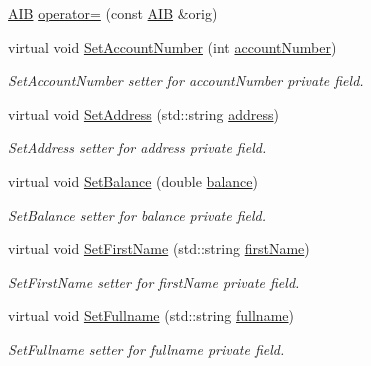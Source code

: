 \begin{DoxyCompactItemize}
\hyperlink{class_a_i_b}{A\+IB} \hyperlink{class_a_i_b_a77b6f74ea3ef39cb1ccb916db7a48740_a77b6f74ea3ef39cb1ccb916db7a48740}{operator=} (const \hyperlink{class_a_i_b}{A\+IB} \&orig)
\item 
virtual void \hyperlink{class_a_i_b_ae582677d2d890f1728dedb9f43965df6_ae582677d2d890f1728dedb9f43965df6}{Set\+Account\+Number} (int \hyperlink{class_a_i_b_aafc08efeec5b8c800c32ee32f20603a7_aafc08efeec5b8c800c32ee32f20603a7}{account\+Number})
\begin{DoxyCompactList}\small\item\em Set\+Account\+Number setter for account\+Number private field. \end{DoxyCompactList}\item 
virtual void \hyperlink{class_a_i_b_ab5fd22fbbc0ea75a022aaeb7174fc450_ab5fd22fbbc0ea75a022aaeb7174fc450}{Set\+Address} (std\+::string \hyperlink{class_a_i_b_ae6a67cc33d1e5fa83a52a238e45ca3dc_ae6a67cc33d1e5fa83a52a238e45ca3dc}{address})
\begin{DoxyCompactList}\small\item\em Set\+Address setter for address private field. \end{DoxyCompactList}\item 
virtual void \hyperlink{class_a_i_b_ac286e13b8cf985bc88ce356b0eaada81_ac286e13b8cf985bc88ce356b0eaada81}{Set\+Balance} (double \hyperlink{class_a_i_b_a3c8d637bd997c1f062d844a88e2559ba_a3c8d637bd997c1f062d844a88e2559ba}{balance})
\begin{DoxyCompactList}\small\item\em Set\+Balance setter for balance private field. \end{DoxyCompactList}\item 
virtual void \hyperlink{class_a_i_b_a671e44bdbf1286d97d7a22295177dd2e_a671e44bdbf1286d97d7a22295177dd2e}{Set\+First\+Name} (std\+::string \hyperlink{class_a_i_b_a869f72057cb63ebf0cfd257069e15c7c_a869f72057cb63ebf0cfd257069e15c7c}{first\+Name})
\begin{DoxyCompactList}\small\item\em Set\+First\+Name setter for first\+Name private field. \end{DoxyCompactList}\item 
virtual void \hyperlink{class_a_i_b_a03def15426e627042951369ea18b97f6_a03def15426e627042951369ea18b97f6}{Set\+Fullname} (std\+::string \hyperlink{class_a_i_b_a818b0cc283af23127c067fb3fc751058_a818b0cc283af23127c067fb3fc751058}{fullname})
\begin{DoxyCompactList}\small\item\em Set\+Fullname setter for fullname private field. \end{DoxyCompactList}\item 

\end{DoxyCompactItemize}

